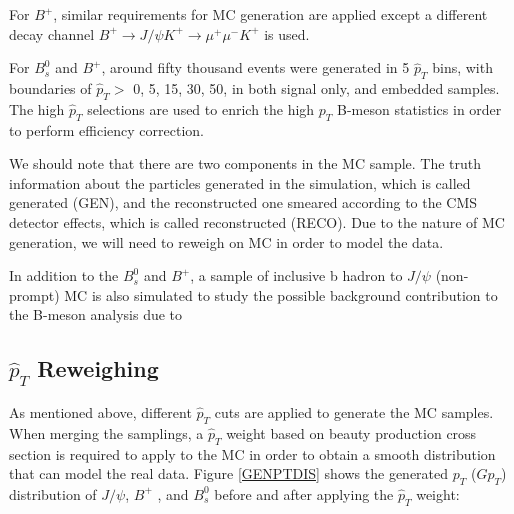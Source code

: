 For $B^+$, similar requirements for MC generation are applied except a different decay channel $B^+ \rightarrow J/\psi K^+ \rightarrow \mu^+\mu^-K^+$ is used.

For $B^0_s$ and $B^+$, around fifty thousand events were generated in 5 $\hat{p}_{T}$ bins, with boundaries of $\hat{p}_{T} >$ 0, 5, 15, 30, 50, in both signal only, and embedded samples. The high $\hat{p}_{T}$ selections are used to enrich the high $p_T$ B-meson statistics in order to perform efficiency correction. 

We should note that there are two components in the MC sample. The truth information about the particles generated in the simulation, which is called generated (GEN), and the reconstructed one smeared according to the CMS detector effects, which is called reconstructed (RECO). Due to the nature of MC generation, we will need to reweigh on MC in order to model the data.

In addition to the $B^0_s$ and $B^+$, a sample of inclusive b hadron to $J/\psi$ (non-prompt) MC is also simulated to study the possible background contribution to the B-meson analysis due to 


\subsection{$\hat{p}_{T}$ Reweighing}


As mentioned above, different $\hat{p}_{T}$ cuts are applied to generate the MC samples. When merging the samplings, a  $\hat{p}_{T}$ weight based on beauty production cross section is required to apply to the MC in order to obtain a smooth distribution that can model the real data. Figure \ref{GENPTDIS} shows the generated $p_T$ ($Gp_T$) distribution of $J/\psi$, $B^+$ , and $B^0_s$ before and after applying the $\hat{p}_{T}$ weight:


